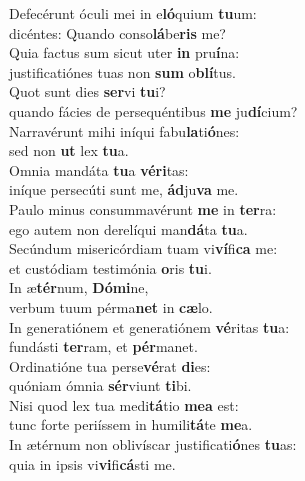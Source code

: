 \evenverse Defecérunt óculi mei in e\textbf{ló}quium \textbf{tu}um:~\*\\
\evenverse dicéntes: Quando conso\textbf{lá}be\textbf{ris} me?\\
\oddverse Quia factus sum sicut uter \textbf{in} pru\textbf{í}na:~\*\\
\oddverse justificatiónes tuas non \textbf{sum} o\textbf{blí}tus.\\
\evenverse Quot sunt dies \textbf{ser}vi \textbf{tu}i?~\*\\
\evenverse quando fácies de persequéntibus \textbf{me} ju\textbf{dí}cium?\\
\oddverse Narravérunt mihi iníqui fabu\textbf{la}ti\textbf{ó}nes:~\*\\
\oddverse sed non \textbf{ut} lex \textbf{tu}a.\\
\evenverse Omnia mandáta \textbf{tu}a \textbf{vé}\textbf{ri}tas:~\*\\
\evenverse iníque persecúti sunt me, \textbf{ád}ju\textbf{va} me.\\
\oddverse Paulo minus consummavérunt \textbf{me} in \textbf{ter}ra:~\*\\
\oddverse ego autem non derelíqui man\textbf{dá}ta \textbf{tu}a.\\
\evenverse Secúndum misericórdiam tuam vi\textbf{ví}fi\textbf{ca} me:~\*\\
\evenverse et custódiam testimónia \textbf{o}ris \textbf{tu}i.\\
\oddverse In æ\textbf{tér}num, \textbf{Dó}\textbf{mi}ne,~\*\\
\oddverse verbum tuum pérma\textbf{net} in \textbf{cæ}lo.\\
\evenverse In generatiónem et generatiónem \textbf{vé}ritas \textbf{tu}a:~\*\\
\evenverse fundásti \textbf{ter}ram, et \textbf{pér}manet.\\
\oddverse Ordinatióne tua perse\textbf{vé}rat \textbf{di}es:~\*\\
\oddverse quóniam ómnia \textbf{sér}viunt \textbf{ti}bi.\\
\evenverse Nisi quod lex tua medi\textbf{tá}tio \textbf{me}\textbf{a} est:~\*\\
\evenverse tunc forte periíssem in humili\textbf{tá}te \textbf{me}a.\\
\oddverse In ætérnum non oblivíscar justificati\textbf{ó}nes \textbf{tu}as:~\*\\
\oddverse quia in ipsis vi\textbf{vi}fi\textbf{cá}sti me.\\
